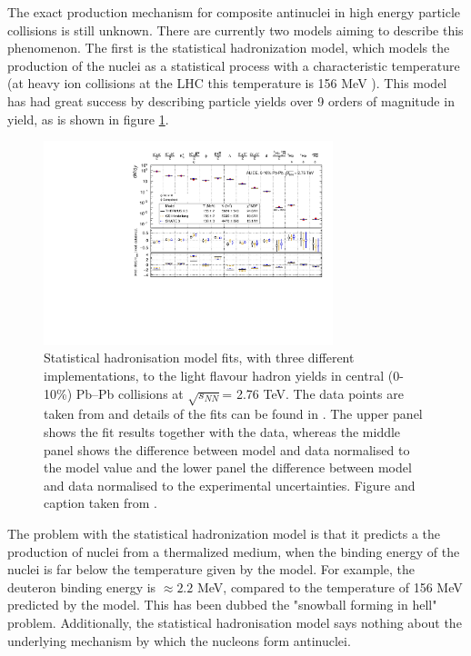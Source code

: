 The exact production mechanism for composite antinuclei in high energy particle collisions is still unknown. There are currently two models aiming to describe this phenomenon. The first is the statistical hadronization model, which models the production of the nuclei as a statistical process with a characteristic temperature (at heavy ion collisions at the LHC this temperature is 156 MeV \cite{4He_PbPb}). This model has had great success by describing particle yields over 9 orders of magnitude in yield, as is shown in figure \ref{fig:Stat_Hadron_model}.

\begin{figure}
    \centering
    \includegraphics[width=0.75\textwidth]{figures/Fit_PbPb0010_GSITHERMUSSHARE_new_alpha_fixed-91746.pdf}
    \caption{Statistical hadronisation model fits, with three different implementations, to the light flavour hadron yields in central (0-10\%) Pb--Pb collisions at $\sqrt{s_{NN}}$= 2.76 TeV. The data points are taken from  and details of the fits can be found in . The upper panel shows the fit results together with the data, whereas the middle panel shows the difference between model and data normalised to the model value and the lower panel the difference between model and data normalised to the experimental uncertainties. Figure and caption taken from \cite{4He_PbPb}.}
    \label{fig:Stat_Hadron_model}
\end{figure}

The problem with the statistical hadronization model is that it predicts a the production of nuclei from a thermalized medium, when the binding energy of the nuclei is far below the temperature given by the model. For example, the deuteron binding energy is $\approx 2.2$ MeV, compared to the temperature of 156 MeV predicted by the model. This has been dubbed the "snowball forming in hell" problem. Additionally, the statistical hadronisation model says nothing about the underlying mechanism by which the nucleons form antinuclei. \\

